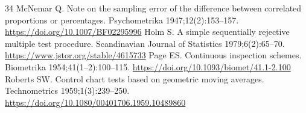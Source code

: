 \documentclass[a4paper,fleqn,doubleblind]{cas-dc}
\begin{document}
\begin{thebibliography}{34}
 McNemar Q. Note on the sampling error of the difference between correlated proportions or percentages. Psychometrika 1947;12(2):153--157. \url{https://doi.org/10.1007/BF02295996}
 Holm S. A simple sequentially rejective multiple test procedure. Scandinavian Journal of Statistics 1979;6(2):65--70. \url{https://www.jstor.org/stable/4615733}
 Page ES. Continuous inspection schemes. Biometrika 1954;41(1--2):100--115. \url{https://doi.org/10.1093/biomet/41.1-2.100}
 Roberts SW. Control chart tests based on geometric moving averages. Technometrics 1959;1(3):239--250. \url{https://doi.org/10.1080/00401706.1959.10489860}
\end{thebibliography}
\end{document}
